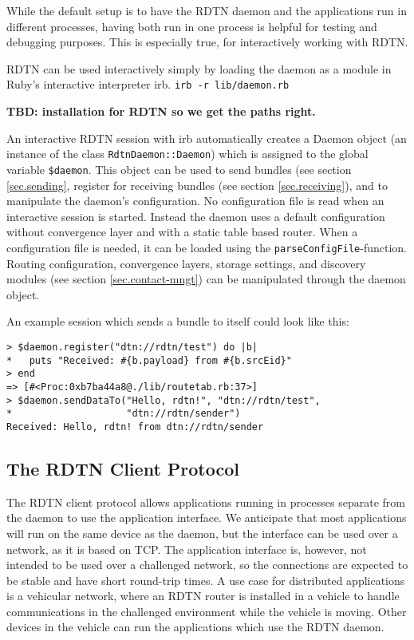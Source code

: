 \documentclass{article}
\begin{document}
While the default setup is to have the RDTN daemon and the applications run in
different processes, having both run in one process is helpful for testing and
debugging purposes. This is especially true, for interactively working with
RDTN. 

RDTN can be used interactively simply by loading the daemon as a module in
Ruby's interactive interpreter irb. {\tt irb -r lib/daemon.rb}

{\bf TBD: installation for RDTN so we get the paths right.}

An interactive RDTN session with irb automatically creates a Daemon object (an
instance of the class {\tt RdtnDaemon::Daemon}) which is assigned to the global
variable {\tt \$daemon}. This object can be used to send bundles (see section
\ref{sec.sending}, register for receiving bundles (see section
\ref{sec.receiving}), and to manipulate the daemon's configuration. No
configuration file is read when an interactive session is started. Instead the
daemon uses a default configuration without convergence layer and with a static
table based router. When a configuration file is needed, it can be loaded
using the {\tt parseConfigFile}-function. Routing configuration, convergence
layers, storage settings, and discovery modules (see section
\ref{sec.contact-mngt}) can be manipulated through the daemon object.

An example session which sends a bundle to itself could look like this:

\begin{verbatim}
> $daemon.register("dtn://rdtn/test") do |b|
*   puts "Received: #{b.payload} from #{b.srcEid}"
> end
=> [#<Proc:0xb7ba44a8@./lib/routetab.rb:37>]
> $daemon.sendDataTo("Hello, rdtn!", "dtn://rdtn/test",
*                    "dtn://rdtn/sender")
Received: Hello, rdtn! from dtn://rdtn/sender
\end{verbatim}

\subsection{The RDTN Client Protocol}\label{sec.client-protocol}

The RDTN client protocol allows applications running in processes separate from
the daemon to use the application interface. We anticipate that most
applications will run on the same device as the daemon, but the interface can be
used over a network, as it is based on TCP. The application interface is,
however, not intended to be used over a challenged network, so the connections
are expected to be stable and have short round-trip times. A use case for
distributed applications is a vehicular network, where an RDTN router is
installed in a vehicle to handle communications in the challenged environment
while the vehicle is moving. Other devices in the vehicle can run the
applications which use the RDTN daemon.
\end{document}
